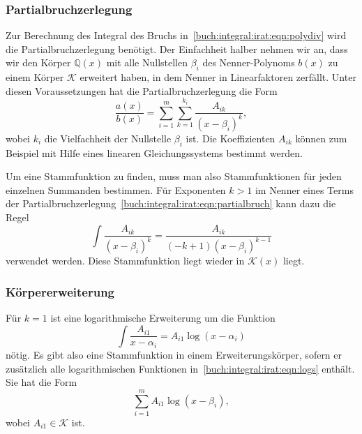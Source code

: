 \subsubsection{Partialbruchzerlegung}
Zur Berechnung des Integral des Bruchs
in~\eqref{buch:integral:irat:eqn:polydiv} wird die Partialbruchzerlegung
benötigt.
Der Einfachheit halber nehmen wir an, dass wir den Körper $\mathbb{Q}(x)$
mit alle Nullstellen $\beta_i$ des Nenner-Polynoms $b(x)$ zu einem Körper
$\mathscr{K}$ erweitert haben, in dem Nenner in Linearfaktoren zerfällt.
Unter diesen Voraussetzungen hat die Partialbruchzerlegung die Form
\begin{equation}
\frac{a(x)}{b(x)}
=
\sum_{i=1}^m
\sum_{k=1}^{k_i}
\frac{A_{ik}}{(x-\beta_i)^k},
\label{buch:integral:irat:eqn:partialbruch}
\end{equation}
wobei $k_i$ die Vielfachheit der Nullstelle $\beta_i$ ist.
Die Koeffizienten $A_{ik}$ können zum Beispiel mit Hilfe eines linearen
Gleichungssystems bestimmt werden.

Um eine Stammfunktion zu finden, muss man also Stammfunktionen für
jeden einzelnen Summanden bestimmen.
Für Exponenten $k>1$ im Nenner eines Terms der
Partialbruchzerlegung~\eqref{buch:integral:irat:eqn:partialbruch}
kann dazu die Regel
\[
\int \frac{A_{ik}}{(x-\beta_i)^k}
=
\frac{A_{ik}}{(-k+1)(x-\beta_i)^{k-1}}
\]
verwendet werden.
Diese Stammfunktion liegt wieder in $\mathscr{K}(x)$ liegt.

%
%
\subsubsection{Körpererweiterung}
Für $k=1$ ist eine logarithmische Erweiterung um die Funktion
\begin{equation}
\int \frac{A_{i1}}{x-\alpha_i}
=
A_{i1}
\log(x-\alpha_i)
\label{buch:integral:irat:eqn:logs}
\end{equation}
nötig.
Es gibt also eine Stammfunktion in einem Erweiterungskörper, sofern
er zusätzlich alle logarithmischen Funktionen
in~\ref{buch:integral:irat:eqn:logs} enthält.
Sie hat die Form
\[
\sum_{i=1}^m A_{i1} \log(x-\beta_i),
\]
wobei $A_{i1}\in\mathscr{K}$ ist.

